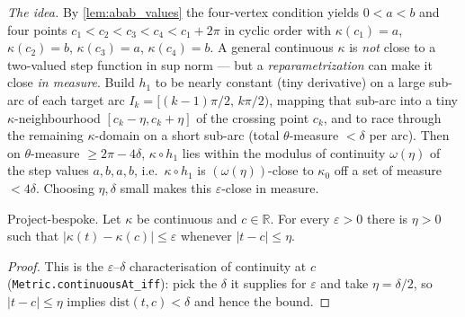 \medskip

\noindent\emph{The idea.} By \cref{lem:abab_values} the four-vertex condition
yields $0 < a < b$ and four points $c_1 < c_2 < c_3 < c_4 < c_1 + 2\pi$ in cyclic
order with $\kappa(c_1)=a$, $\kappa(c_2)=b$, $\kappa(c_3)=a$, $\kappa(c_4)=b$. A
general continuous $\kappa$ is \emph{not} close to a two-valued step function in
sup norm --- but a \emph{reparametrization} can make it close \emph{in measure}.
Build $h_1$ to be nearly constant (tiny derivative) on a large sub-arc of each
target arc $I_k = [(k-1)\pi/2,\,k\pi/2)$, mapping that sub-arc into a tiny
$\kappa$-neighbourhood $[c_k-\eta, c_k+\eta]$ of the crossing point $c_k$, and to
race through the remaining $\kappa$-domain on a short sub-arc (total $\theta$-measure
$<\delta$ per arc). Then on $\theta$-measure $\ge 2\pi - 4\delta$, $\kappa\circ h_1$
lies within the modulus of continuity $\omega(\eta)$ of the step values $a,b,a,b$,
i.e.\ $\kappa\circ h_1$ is $(\omega(\eta))$-close to $\kappa_0$ off a set of measure
$<4\delta$. Choosing $\eta,\delta$ small makes this $\varepsilon$-close in measure.

\begin{lemma}

  \label{lem:kappa_modulus_at}
  Project-bespoke. Let $\kappa$ be continuous and $c\in\mathbb{R}$. For every
  $\varepsilon>0$ there is $\eta>0$ such that $\lvert\kappa(t)-\kappa(c)\rvert\le
  \varepsilon$ whenever $\lvert t-c\rvert\le\eta$.
\end{lemma}
\begin{proof}

\leanok
  This is the $\varepsilon$--$\delta$ characterisation of continuity at $c$
  (\texttt{Metric.continuousAt\_iff}): pick the $\delta$ it supplies for
  $\varepsilon$ and take $\eta=\delta/2$, so $\lvert t-c\rvert\le\eta$ implies
  $\mathrm{dist}(t,c)<\delta$ and hence the bound.
\end{proof}

